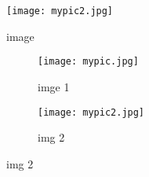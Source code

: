 \documentclass{article}
\begin{document}
	\begin{figure}
		\centering
		 \texttt{[image: mypic2.jpg]}
		 \caption{image}
		 \label{fig}
	\end{figure}

\begin{figure}[htbp]
	\centering
	\begin{subfigure}[b]{0.45\textwidth}
		\centering
		\texttt{[image: mypic.jpg]}
		\caption{imge 1}
		\label{fig1}
	\end{subfigure}

		\begin{subfigure}[b]{0.45\textwidth}
		\centering
		\texttt{[image: mypic2.jpg]}
		\caption{img 2}
		\label{fig2}
	\end{subfigure}
	 
\end{figure}

		
\end{document}
